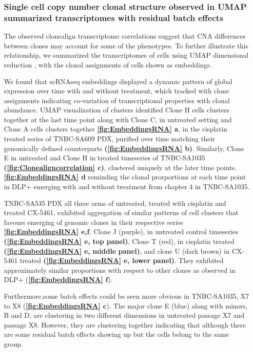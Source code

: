   
\subsubsection{Single cell copy number clonal structure observed in UMAP summarized transcriptomes with residual batch effects}

The observed clonealign transcriptome correlations suggest that CNA differences between clones may account for some of the phenotypes. To further illustrate this relationship, we summarized the transcriptomes of cells using UMAP dimensional reduction \cite{becht2019dimensionality}, with the clonal assignments of cells shown as embeddings. 

 We found that scRNAseq embeddings displayed a dynamic pattern of global expression over time with and without treatment, which tracked with clone assignments indicating co-variation of transcriptional properties with clonal abundance. UMAP visualization of clusters identified Clone H cells clusters together at the last time point along with Clone C, in untreated setting and Clone A cells clusters together \textbf{\autoref{fig:EmbeddingsRNA} a}, in the cisplatin treated series of TNBC-SA609 PDX, purified over time matching their genomically defined counterparts \textbf{(\autoref{fig:EmbeddingsRNA} b)}. Similarly, Clone E in untreated and Clone H in treated timeseries of TNBC-SA1035  \textbf{(\autoref{fig:Clonealigncorrelation} c)}, clustered uniquely at the later time points. \textbf{\autoref{fig:EmbeddingsRNA} d} reminding the clonal prorportions at each time point in DLP+ emerging with and without treatment from chapter 4 in TNBC-SA1035. 

TNBC-SA535 PDX all three arms of untreated, treated with cisplatin and treated CX-5461, exhibited aggregation of similar patterns of cell clusters that favours emerging of genomic clones in their respective series \textbf{\autoref{fig:EmbeddingsRNA} e,f}. Clone J (purple), in untreated control timeseries \textbf{(\autoref{fig:EmbeddingsRNA} e, top panel)}, Clone T (red), in cisplatin treated \textbf{(\autoref{fig:EmbeddingsRNA} e, middle panel)}, and clone U (dark brown) in CX-5461 treated \textbf{(\autoref{fig:EmbeddingsRNA} e, lower panel)}. They exhibited approximately similar proportions with respect to other clones as observed in DLP+ (\textbf{\autoref{fig:EmbeddingsRNA} f}). 

Furthermore,some batch effects could be seen more obvious in TNBC-SA1035, X7 to X8 (\textbf{\autoref{fig:EmbeddingsRNA} c}). The major clone E (blue) along with minors, B and D, are clustering in two different dimensions in untreated passage X7 and passage X8. However, they are clustering together indicating that although there are some residual batch effects showing up but the cells belong to the same group.

